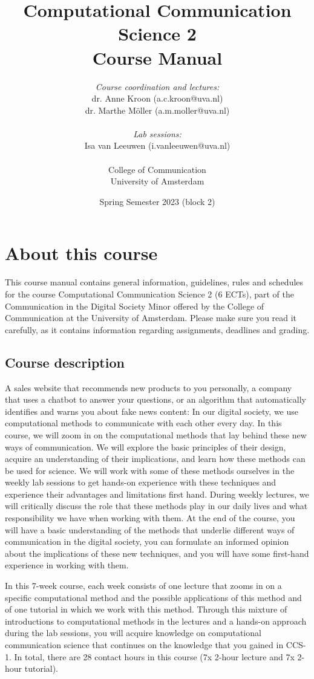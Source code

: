 \documentclass[a4paper,10pt,twocolumn]{report}
\title{Computational Communication Science 2\\ Course Manual}
\author{\emph{Course coordination and lectures:}\\ dr. Anne Kroon (a.c.kroon@uva.nl)\\dr. Marthe Möller (a.m.moller@uva.nl) \\ \\ \emph{Lab sessions:} \\Isa van Leeuwen (i.vanleeuwen@uva.nl) \\~\\College of Communication\\University of Amsterdam}
\date{Spring Semester 2023 (block 2)}
\begin{document}
	\maketitle
	
	\tableofcontents

	
	\chapter{About this course}
	
	This course manual contains general information, guidelines, rules and schedules for the course Computational Communication Science 2 (6 ECTs), part of the Communication in the Digital Society Minor offered by the College of Communication at the University of Amsterdam. Please make sure you read it carefully, as it  contains information regarding assignments, deadlines and grading.
	
	\section{Course description}
	
	A sales website that recommends new products to you personally, a company that uses a chatbot to answer your questions, or an algorithm that automatically identifies and warns you about fake news content: In our digital society, we use computational methods to communicate with each other every day. In this course, we will zoom in on the computational methods that lay behind these new ways of communication. We will explore the basic principles of their design, acquire an understanding of their implications, and learn how these methods can be used for science. We will work with some of these methods ourselves in the weekly lab sessions to get hands-on experience with these techniques and experience their advantages and limitations first hand. During weekly lectures, we will critically discuss the role that these methods play in our daily lives and what responsibility we have when working with them. At the end of the course, you will have a basic understanding of the methods that underlie different ways of communication in the digital society, you can formulate an informed opinion about the implications of these new techniques, and you will have some first-hand experience in working with them.
	
	In this 7-week course, each week consists of one lecture that zooms in on a specific computational method and the possible applications of this method and of one tutorial in which we work with this method. Through this mixture of introductions to computational methods in the lectures and a hands-on approach during the lab sessions, you will acquire knowledge on computational communication science that continues on the knowledge that you gained in CCS-1. In total, there are 28 contact hours in this course (7x 2-hour lecture and 7x 2-hour tutorial). 
	
\end{document}
